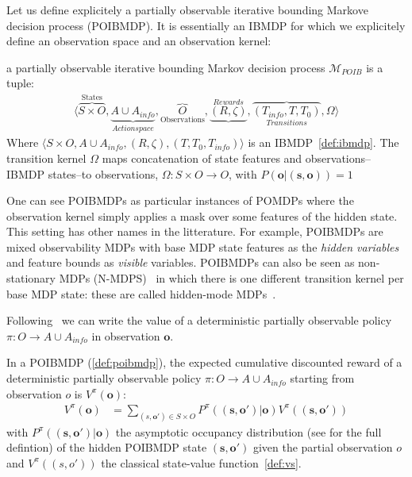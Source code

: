 Let us define explicitely a partially observable iterative bounding Markove decision process (POIBMDP). It is essentially an IBMDP for which we explicitely define an observation space and an observation kernel:
\begin{definition}\label{def:poibmdp} a partially observable iterative bounding Markov decision process $\mathcal{M}_{POIB}$ is a tuple:
    \begin{align*}
        \langle \overbrace{S\times O}^{\text{States}}, \underbrace{A\cup A_{info}}_{Action space},\overbrace{O}_{\text{Observations}} ,\underbrace{(R, \zeta)}^{Rewards}, \overbrace{(T_{info}, T, T_0)}_{Transitions}, \Omega \rangle
    \end{align*}
    Where $\langle S\times O, A\cup A_{info}, (R, \zeta),( T, T_0, T_{info})\rangle$ is an IBMDP~\ref{def:ibmdp}.
    The transition kernel $\Omega$ maps concatenation of state features and observations--IBMDP states--to observations, $\Omega:S\times O \rightarrow O$, with $P(\boldsymbol{o}|(\boldsymbol{s}, \boldsymbol{o}))=1$ 
\end{definition}

One can see POIBMDPs as particular instances of POMDPs where the observation kernel simply applies a mask over some features of the hidden state.
This setting has other names in the litterature.
For example, POIBMDPs are mixed observability MDPs \cite{momdp} with base MDP state features as the \textit{hidden variables} and feature bounds as \textit{visible} variables.
POIBMDPs can also be seen as non-stationary MDPs (N-MDPS)~\cite{learning-pomdp} in which there is one different transition kernel per base MDP state: these are called hidden-mode MDPs~\cite{hmmdp}. 

Following~\cite{learning-pomdp} we can write the value of a deterministic partially observable policy $\pi:O\rightarrow A\cup A_{info}$ in observation $\boldsymbol{o}$.

\begin{definition}\label{def:vpo} In a POIBMDP (\ref{def:poibmdp}), the expected cumulative discounted reward of a deterministic partially observable policy $\pi:O\rightarrow A\cup A_{info}$ starting from observation $o$ is $V^{\pi}(\boldsymbol{o})$:
    \begin{align*}
        V^{\pi}(\boldsymbol{o}) &= \underset{(s,\boldsymbol{o}')\in S\times O}{\sum}P^{\pi}((\boldsymbol{s}, \boldsymbol{o}')|\boldsymbol{o})V^{\pi}((\boldsymbol{s}, \boldsymbol{o}'))
    \end{align*}
with $P^{\pi}((\boldsymbol{s}, \boldsymbol{o}')|\boldsymbol{o})$ the asymptotic occupancy distribution (see \cite[section 4]{learning-pomdp} for the full defintion) of the hidden POIBMDP state $(\boldsymbol{s},\boldsymbol{o}')$ given the partial observation $o$ and $V^{\pi}((s, o'))$ the classical state-value function~\ref{def:vs}.
\end{definition}

